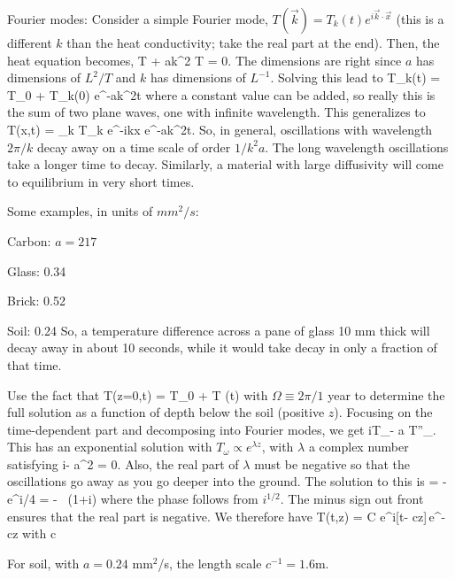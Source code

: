 \documentclass[11pt]{book}
\begin{document}
Fourier modes: Consider a simple Fourier mode, $T(\vec k) = T_k(t) e^{i\vec k \cdot \vec x}$ (this is a different $k$ than the heat conductivity; take the real part at the end). Then, the heat equation becomes,
\be
\dot T + ak^2 T = 0.\ee
The dimensions are right since $a$ has dimensions of $L^2/T$ and $k$ has dimensions of $L^{-1}$. Solving this lead to
\be
T_k(t) = T_0 + T_k(0) e^{-ak^2t}\ee
where a constant value can be added, so really this is the sum of two plane waves, one with infinite wavelength. This generalizes to
\be
T(\vec x,t) = \sum_{\vec k} T_k e^{-i\vec k\cdot\vec x} e^{-ak^2t}.\ee
So, in general, oscillations with wavelength $2\pi/k$ decay away on a time scale of order $1/k^2a$. The long wavelength oscillations take a longer time to decay. Similarly, a material with large diffusivity will come to equilibrium in very short times.

Some examples, in units of $mm^2/s$:
\bee
\item Carbon: $a=217$
\item Glass: 0.34
\item Brick: 0.52
\item Soil: 0.24
\eee
So, a temperature difference across a pane of glass 10 mm thick will decay away in about 10 seconds, while it would take decay in only a fraction of that time.

Use the fact that
\be T(z=0,t) = T_0 + \Delta T \sin(\omega t)
\ee
with $\Omega \equiv 2\pi/1$ year to determine the full solution as a function of depth below the soil (positive $z$). Focusing on the time-dependent part and decomposing into Fourier modes, we get
\be
i\omega T_\omega - a T''_.\ee
This has an exponential solution with $T_\omega \propto e^{\lambda z}$, with $\lambda$ a complex number satisfying
\be
i\omega - a\lambda^2 = 0.\ee
Also, the real part of $\lambda$ must be negative so that the oscillations go away as you go deeper into the ground. The solution to this is
\be
\lambda = -\, e^{i\pi/4} = - \, (1+i)
\ee
where the phase follows from $i^{1/2}$. The minus sign out front ensures that the real part is negative. We therefore have
\be
T(t,z) = C e^{i[\omega t- cz]}\,e^{-cz}
\ee
with
\be
c\equiv {}\ee

For soil, with $a=0.24$ mm$^2$/s, the length scale $c^{-1}= 1.6$m.


\end{document}
